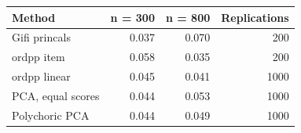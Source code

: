 \begin{tabular}{lrrr}
\toprule
Method & n = 300 & n = 800 & Replications \\
\midrule
Gifi princals & 0.037 & 0.070 & 200 \\
ordpp item & 0.058 & 0.035 & 200 \\
ordpp linear & 0.045 & 0.041 & 1000 \\
PCA, equal scores & 0.044 & 0.053 & 1000 \\
Polychoric PCA & 0.044 & 0.049 & 1000 \\
\bottomrule
\end{tabular}
